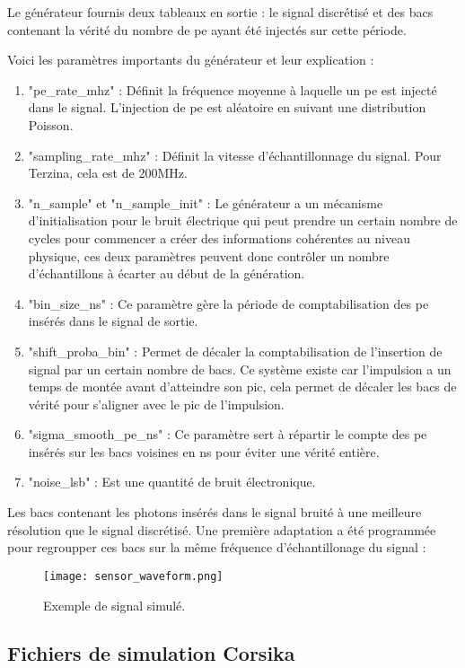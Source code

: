 Le générateur fournis deux tableaux en sortie : le signal discrétisé et des bacs contenant la vérité du nombre de \gls{pe} ayant été injectés sur cette période.

Voici les paramètres importants du générateur et leur explication :
\begin{enumerate}
    \item "pe\_rate\_mhz" : Définit la fréquence moyenne à laquelle un \gls{pe} est injecté dans le signal.
        L'injection de \gls{pe} est aléatoire en suivant une distribution Poisson.
    \item "sampling\_rate\_mhz" : Définit la vitesse d'échantillonnage du signal. Pour Terzina, cela est de 200MHz.
    \item "n\_sample" et "n\_sample\_init" : Le générateur a un mécanisme d'initialisation pour le bruit électrique 
        qui peut prendre un certain nombre de cycles pour commencer a créer des informations cohérentes au niveau physique, 
        ces deux paramètres peuvent donc contrôler un nombre d'échantillons à écarter au début de la génération.
    \item "bin\_size\_ns" : Ce paramètre gère la période de comptabilisation des \gls{pe} insérés dans le signal de sortie.
    \item "shift\_proba\_bin" : Permet de décaler la comptabilisation de l'insertion de signal par un certain nombre de bacs.
        Ce système existe car l'impulsion a un temps de montée avant d'atteindre son pic, cela permet de décaler les bacs 
        de vérité pour s'aligner avec le pic de l'impulsion.
    \item "sigma\_smooth\_pe\_ns" : Ce paramètre sert à répartir le compte des \gls{pe} insérés sur les bacs voisines en ns
        pour éviter une vérité entière. 
    \item "noise\_lsb" : Est une quantité de bruit électronique.
\end{enumerate}

Les bacs contenant les photons insérés dans le signal bruité à une meilleure résolution que le signal discrétisé. 
Une première adaptation a été programmée pour regroupper ces bacs sur la même fréquence d'échantillonage du signal :

\begin{figure}[tbph!]
	\centering
	\texttt{[image: sensor\_waveform.png]}
	\caption[Exemple de signal simulé]{Exemple de signal simulé.}
\end{figure}

\subsection{Fichiers de simulation Corsika}

